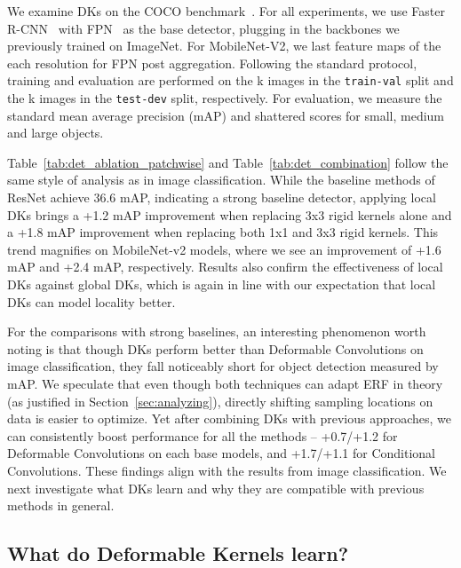 \documentclass{article} \usepackage{iclr2020_conference, times}
\begin{document}
We examine DKs on the COCO benchmark~\citep{lin2014microsoft}.
For all experiments, we use Faster R-CNN~\citep{ren2015faster} with
FPN~\citep{lin2017feature} as the base detector, plugging in the backbones we
previously trained on ImageNet.
For MobileNet-V2, we last feature maps of the each resolution for FPN post
aggregation.
Following the standard protocol, training and evaluation are performed on the
k images in the \texttt{train-val} split and the k images in the
\texttt{test-dev} split, respectively.
For evaluation, we measure the standard mean average precision (mAP) and
shattered scores for small, medium and large objects.

Table~\ref{tab:det_ablation_patchwise} and Table~\ref{tab:det_combination}
follow the same style of analysis as in image classification.
While the baseline methods of ResNet achieve 36.6 mAP, indicating a strong
baseline detector, applying local DKs brings a +1.2 mAP
improvement when replacing 3x3 rigid kernels alone and a +1.8 mAP improvement
when replacing both 1x1 and 3x3 rigid kernels.
This trend magnifies on MobileNet-v2 models, where we see an improvement of
+1.6 mAP and +2.4 mAP, respectively.
Results also confirm the effectiveness of local DKs against global DKs, which
is again in line with our expectation that local DKs can model locality better.

For the comparisons with strong baselines,
an interesting phenomenon worth noting is that though DKs perform better than
Deformable Convolutions on image classification, they fall noticeably short for
object detection measured by mAP.
We speculate that even though both techniques can adapt ERF in theory (as
justified in Section~\ref{sec:analyzing}), directly shifting sampling locations
on data is easier to optimize.
Yet after combining DKs with previous approaches, we can consistently boost performance
for all the methods -- +0.7/+1.2 for Deformable Convolutions on each base
models, and +1.7/+1.1 for Conditional Convolutions.
These findings align with the results from image classification.
We next investigate what DKs learn and why they are compatible with previous
methods in general.


\subsection{What do Deformable Kernels learn?} \label{sec:understanding}
\end{document}
